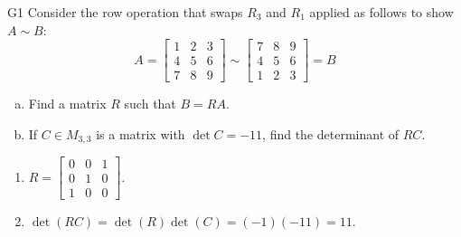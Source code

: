 \begin{problem}{G1}
Consider the row operation that swaps \(R_3\) and \(R_1\) applied as follows to show
\(A\sim B\):
\[
A=\begin{bmatrix}1&2&3\\4&5&6\\7&8&9\end{bmatrix}
  \sim
\begin{bmatrix}7&8&9\\4&5&6\\1&2&3\end{bmatrix}=B
\]
\begin{enumerate}[(a)]
\item Find a matrix \(R\) such that \(B=RA\).
\item If \(C \in M_{3,3}\) is a matrix with \(\det C = -11\), find the determinant of \(RC\).
\end{enumerate}
\end{problem}
\begin{solution}
\begin{enumerate}
\item \(R= \begin{bmatrix} 0 & 0 & 1 \\ 0 & 1 & 0 \\ 1 & 0 & 0 \end{bmatrix}\).
\item \(\det(RC)= \det(R)\det(C)=(-1)(-11)=11\).
\end{enumerate}
\end{solution}

